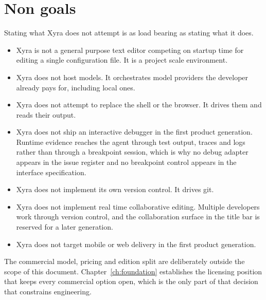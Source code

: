 \section{Non goals}

Stating what Xyra does not attempt is as load bearing as stating what it does.

\begin{itemize}
  \item Xyra is not a general purpose text editor competing on startup time for editing a
  single configuration file. It is a project scale environment.
  \item Xyra does not host models. It orchestrates model providers the developer already
  pays for, including local ones.
  \item Xyra does not attempt to replace the shell or the browser. It drives them and reads
  their output.
  \item Xyra does not ship an interactive debugger in the first product generation. Runtime
  evidence reaches the agent through test output, traces and logs rather than through a
  breakpoint session, which is why no debug adapter appears in the issue register and no
  breakpoint control appears in the interface specification.
  \item Xyra does not implement its own version control. It drives git.
  \item Xyra does not implement real time collaborative editing. Multiple developers work
  through version control, and the collaboration surface in the title bar is reserved for a
  later generation.
  \item Xyra does not target mobile or web delivery in the first product generation.
\end{itemize}

The commercial model, pricing and edition split are deliberately outside the scope of this
document. Chapter~\ref{ch:foundation} establishes the licensing position that keeps every
commercial option open, which is the only part of that decision that constrains engineering.
